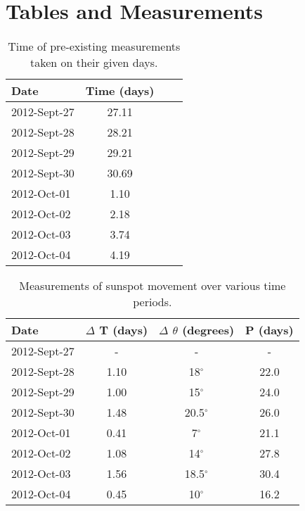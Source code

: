 \documentclass{article}
\begin{document}

\section{Tables and Measurements}
\label{sec:tnm}

\begin{table}[h]
\begin{center}
\begin{tabular}{l c c c}
\hline
Date & Time (days) \\
\hline
\hline
2012-Sept-27 & 27.11 \\
2012-Sept-28 & 28.21 \\
2012-Sept-29 & 29.21 \\
2012-Sept-30 & 30.69 \\
2012-Oct-01 & 1.10 \\
2012-Oct-02 & 2.18 \\
2012-Oct-03 & 3.74 \\
2012-Oct-04 & 4.19 \\
\hline
\end{tabular}
\end{center}
\caption{Time of pre-existing measurements taken on their given days.\label{tab:time}}
\end{table}

\begin{table}[h!]
\begin{center}
\begin{tabular}{l c c c}
\hline
Date & $\Delta$ T (days) & $\Delta$ $\theta$ (degrees) & P (days) \\
\hline
\hline
2012-Sept-27 & - & - & - \\
2012-Sept-28 & 1.10 & 18$^\circ$ & 22.0 \\
2012-Sept-29 & 1.00 & 15$^\circ$ & 24.0 \\
2012-Sept-30 & 1.48 & 20.5$^\circ$ & 26.0 \\
2012-Oct-01 & 0.41 & 7$^\circ$ & 21.1 \\
2012-Oct-02 & 1.08 & 14$^\circ$ & 27.8 \\
2012-Oct-03 & 1.56 & 18.5$^\circ$ & 30.4 \\
2012-Oct-04 & 0.45 & 10$^\circ$ & 16.2 \\
\hline
\end{tabular}
\end{center}
\caption{Measurements of sunspot movement over various time periods.\label{tab:main}}
\end{table}
\end{document}

